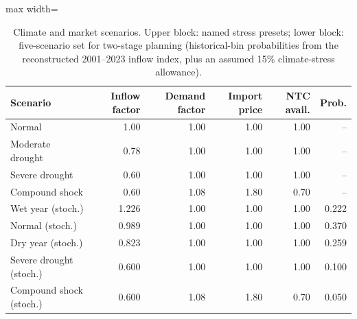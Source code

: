 \begin{table}[htbp]
\centering
\small
\caption{Climate and market scenarios. Upper block: named stress presets; lower block: five-scenario set for two-stage planning (historical-bin probabilities from the reconstructed 2001--2023 inflow index, plus an assumed 15\% climate-stress allowance).}
\label{tab:scenarios}
\begin{adjustbox}{max width=\linewidth}
\begin{tabular}{lrrrrr}
\toprule
Scenario & Inflow factor & Demand factor & Import price & NTC avail. & Prob. \\
\midrule
Normal & 1.00 & 1.00 & 1.00 & 1.00 & -- \\
Moderate drought & 0.78 & 1.00 & 1.00 & 1.00 & -- \\
Severe drought & 0.60 & 1.00 & 1.00 & 1.00 & -- \\
Compound shock & 0.60 & 1.08 & 1.80 & 0.70 & -- \\
Wet year (stoch.) & 1.226 & 1.00 & 1.00 & 1.00 & 0.222 \\
Normal (stoch.) & 0.989 & 1.00 & 1.00 & 1.00 & 0.370 \\
Dry year (stoch.) & 0.823 & 1.00 & 1.00 & 1.00 & 0.259 \\
Severe drought (stoch.) & 0.600 & 1.00 & 1.00 & 1.00 & 0.100 \\
Compound shock (stoch.) & 0.600 & 1.08 & 1.80 & 0.70 & 0.050 \\
\bottomrule
\end{tabular}
\end{adjustbox}
\end{table}
